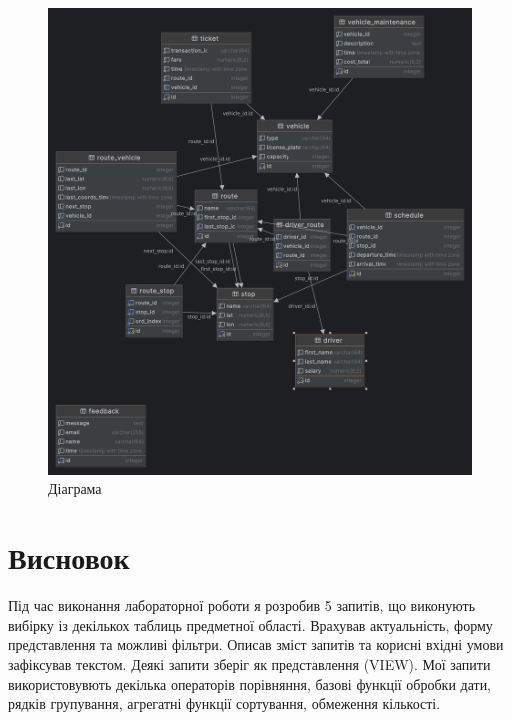 \documentclass[14pt]{extreport}
\begin{document}
\begin{normalsize}
	\begin{figure}[H]
		\centering
		\includegraphics[scale=0.23]{6}
		\caption{Діаграма}
	\end{figure}
	
	
	\section*{Висновок}
	Під час виконання лабораторної роботи я розробив 5 запитів, що виконують вибірку із декількох таблиць предметної області. Врахував актуальність, форму представлення та можливі фільтри. Описав зміст запитів та корисні вхідні умови зафіксував текстом. Деякі запити зберіг як представлення (VIEW).
	Мої запити використовувють декілька операторів порівняння, базові функції обробки дати, рядків групування, агрегатні функції сортування, обмеження кількості.
	 
\end{normalsize}
\end{document}
